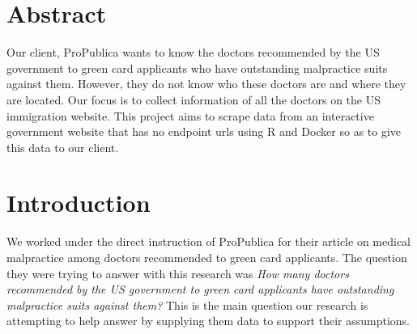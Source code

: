 \documentclass[10pt,letterpaper]{article}
\newcommand{\getIndex}[2]{
  \ForEach{,}{\IfEq{#1}{\thislevelitem}{\number\thislevelcount\ExitForEach}{}}{#2}
}
\newcommand{\getAff}[1]{
  \getIndex{#1}{}
}
\begin{document}
\vspace*{0.2in}

\section*{Abstract}
Our client, ProPublica wants to know the doctors recommended by the US
government to green card applicants who have outstanding malpractice
suits against them. However, they do not know who these doctors are and
where they are located. Our focus is to collect information of all the
doctors on the US immigration website. This project aims to scrape data
from an interactive government website that has no endpoint urls using R
and Docker so as to give this data to our client.


\linenumbers

\section{Introduction}\label{introduction}

We worked under the direct instruction of ProPublica for their article
on medical malpractice among doctors recommended to green card
applicants. The question they were trying to answer with this research
was \emph{How many doctors recommended by the US government to green
card applicants have outstanding malpractice suits against them?} This
is the main question our research is attempting to help answer by
supplying them data to support their assumptions.
\end{document}
